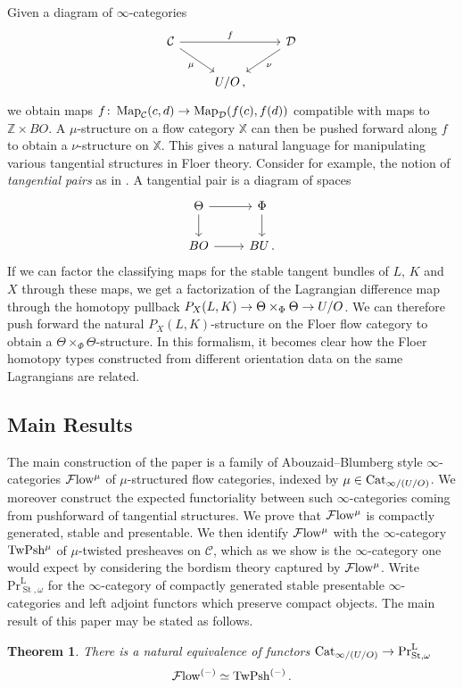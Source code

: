\documentclass[10pt]{amsart}
\numberwithin{equation}{section}
\newtheorem{theorem}[prop]{Theorem}
\theoremstyle{definition}
\DeclareMathOperator{\Map}{Map}
\DeclareMathOperator{\St}{St}
\renewcommand{\Pr}{\mathrm{Pr}}
\newcommand{\rL}{\mathrm{L}}
\newcommand{\Flow}{\cF\mathrm{low}\vphantom{w}}
\newcommand{\TwShv}{\mathrm{TwPsh}\vphantom{h}}
\newcommand{\Cat}{\mathrm{Cat}\vphantom{t}}
\newcommand{\bZ}{\mathbb{Z}}
\newcommand{\bX}{\mathbb{X}}
\newcommand{\cC}{\mathcal{C}}
\newcommand{\calD}{\mathcal{D}}
\newcommand{\cF}{\mathcal{F}}
\renewcommand{\to}{\mathchoice{\longrightarrow}{\rightarrow}{}{}}
\begin{document}
Given a diagram of $\infty$-categories
\begin{equation}\label{eq:C->D_overU/O}
	\begin{tikzcd}
		\cC \arrow[rr, "f"] \arrow[dr, "\mu"']    &  &   \calD  \arrow[dl, "\nu"] \\
		&  U/O\,, &
	\end{tikzcd}
\end{equation}
we obtain maps $f\colon \Map_{\cC}(c,d) \to \Map_{\calD}(f(c),f(d))$ compatible with maps to $\bZ\times BO$.
A $\mu$-structure on a flow category $\bX$ can then be pushed forward along $f$ to obtain a $\nu$-structure on $\bX$.
This gives a natural language for manipulating various tangential structures in Floer theory.
Consider for example, the notion of \emph{tangential pairs} as in \cite{porcelli2024spectral}.
A tangential pair is a diagram of spaces
\begin{equation}\label{eq:tangential_pair}
	\begin{tikzcd}
		\Theta \arrow[r] \arrow[d]      &   \Phi  \arrow[d] \\
		BO  \arrow[r]               &  BU \,.
	\end{tikzcd}
\end{equation}
If we can factor the classifying maps for the stable tangent bundles of $L$, $K$ and $X$ through these maps, we get a factorization of the Lagrangian difference map through the homotopy pullback $P_{X}(L,K)\to \Theta\times_{\Phi} \Theta \to U/O$.
We can therefore push forward the natural $P_{X}(L,K)$-structure on the Floer flow category to obtain a $\Theta\times_{\Phi}\Theta$-structure.
In this formalism, it becomes clear how the Floer homotopy types constructed from different orientation data on the same Lagrangians are related.


\subsection*{Main Results}\label{subsec:main_results}

 The main construction of the paper is a family of Abouzaid--Blumberg style $\infty$-categories $\Flow^{\mu}$ of $\mu$-structured flow categories, indexed by $\mu\in \Cat_{\infty/(U/O)}$.
 We moreover construct the expected functoriality between such $\infty$-categories coming from pushforward of tangential structures. We prove that $\Flow^{\mu}$ is compactly generated, stable and presentable.
 We then identify $\Flow^{\mu}$ with the $\infty$-category $\TwShv^{\mu}$ of $\mu$-twisted presheaves on $\cC$, which as we show is the $\infty$-category one would expect by considering the bordism theory captured by $\Flow^{\mu}$.
 Write $\Pr^{\rL}_{\St,\omega}$ for the $\infty$-category of compactly generated stable presentable $\infty$-categories and left adjoint functors which preserve compact objects.
 The main result of this paper may be stated as follows.
\begin{theorem}\label{thm:Flow=TwPsh}
	There is a natural equivalence of functors $\Cat_{\infty /(U/O)} \to \Pr^{\rL}_{\St,\omega}$
	\begin{align*}
		\Flow^{(-)} \simeq \TwShv^{(-)}\,.
	\end{align*}
\end{theorem}
\end{document}
